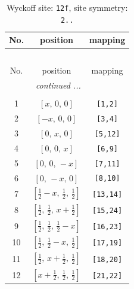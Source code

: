 \documentclass[fleqn,8pt]{jsarticle}
\begin{document}
\begin{longtable}{ccc}
\caption{Wyckoff site: {\tt 12f}, site symmetry: {\tt 2..}}
 \\
 \hline \hline
No. & position & mapping \\ \hline \endfirsthead

\multicolumn{2}{l}{\tablename\ \thetable{}} \\
 \hline \hline
No. & position & mapping \\ \hline \endhead

 \hline \hline
\multicolumn{2}{r}{\footnotesize\it continued ...} \\ \endfoot

 \hline \hline
\multicolumn{2}{r}{} \\ \endlastfoot

1 & $\left[ x,\, 0,\, 0 \right]$ & {\tt [1,2]} \\ \hline
2 & $\left[ - x,\, 0,\, 0 \right]$ & {\tt [3,4]} \\ \hline
3 & $\left[ 0,\, x,\, 0 \right]$ & {\tt [5,12]} \\ \hline
4 & $\left[ 0,\, 0,\, x \right]$ & {\tt [6,9]} \\ \hline
5 & $\left[ 0,\, 0,\, - x \right]$ & {\tt [7,11]} \\ \hline
6 & $\left[ 0,\, - x,\, 0 \right]$ & {\tt [8,10]} \\ \hline
7 & $\left[ \frac{1}{2} - x,\, \frac{1}{2},\, \frac{1}{2} \right]$ & {\tt [13,14]} \\ \hline
8 & $\left[ \frac{1}{2},\, \frac{1}{2},\, x + \frac{1}{2} \right]$ & {\tt [15,24]} \\ \hline
9 & $\left[ \frac{1}{2},\, \frac{1}{2},\, \frac{1}{2} - x \right]$ & {\tt [16,23]} \\ \hline
10 & $\left[ \frac{1}{2},\, \frac{1}{2} - x,\, \frac{1}{2} \right]$ & {\tt [17,19]} \\ \hline
11 & $\left[ \frac{1}{2},\, x + \frac{1}{2},\, \frac{1}{2} \right]$ & {\tt [18,20]} \\ \hline
12 & $\left[ x + \frac{1}{2},\, \frac{1}{2},\, \frac{1}{2} \right]$ & {\tt [21,22]} \\
\end{longtable}
\renewcommand{\arraystretch}{1.2}
\end{document}
